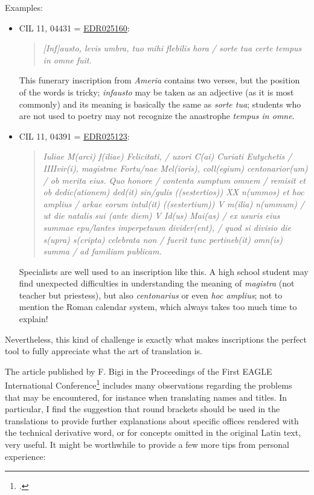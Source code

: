 \documentclass[amsthm,ebook]{saparticle}
\begin{document}
Examples:
\begin{itemize}
\item CIL 11, 04431 = \href{http://www.edr-edr.it/edr\_programmi/res\_complex\_comune.php?do=book\&id\_nr=EDR025160}{EDR025160}: \begin{quotation}
\emph{[Inf]austo, levis umbra, tuo mihi flebilis hora / sorte
tua certe tempus in omne fuit.}

\end{quotation}
This funerary inscription from \emph{Ameria} contains two verses, but the position of the words is tricky; \emph{infausto} may be
taken as an adjective (as it is most commonly) and its meaning is basically the same as \emph{sorte tua}; students who are not
used to poetry may not recognize the anastrophe \emph{tempus in omne}.

 \item CIL 11, 04391 = \href{http://www.edr-edr.it/edr\_programmi/res\_complex\_comune.php?do=book\&id\_nr=EDR025123}{EDR025123}:\begin{quotation}
\emph{ Iuliae M(arci) f(iliae) Felicitati, / uxori C(ai) Curiati
Eutychetis / IIIIvir(i), magistrae Fortu/nae Mel(ioris), coll(egium) centonarior(um) / ob merita eius. Quo honore /
contenta sumptum omnem / remisit et ob dedic(ationem) ded(it) sin/gulis ((sestertios)) XX n(ummos) et hoc amplius /
arkae eorum intul(it) ((sestertium)) V m(ilia) n(ummum) / ut die natalis sui (ante diem) V Id(us) Mai(as) / ex usuris
eius summae epu/lantes imperpetuum divider(ent), / quod si divisio die s(upra) s(cripta) celebrata non / fuerit tunc
pertineb(it) omn(is) summa / ad familiam publicam. }

\end{quotation}
Specialists are well used to an inscription like this. A high school student may find unexpected difficulties in
understanding the meaning of \emph{magistra} (not teacher but priestess), but also \emph{centonarius} or even \emph{hoc amplius}; not to
mention the Roman calendar system, which always takes too much time to explain!

\end{itemize}

Nevertheless, this kind of challenge is exactly what makes inscriptions the perfect tool to fully appreciate what the
art of translation is.

The article published by F. Bigi in the Proceedings of the First EAGLE International Conference\footnote{\citet{Bigi2014}.}
includes many observations regarding the problems that may be encountered, for instance when translating names and
titles. In particular, I find the suggestion that round brackets should be used in the translations to provide further
explanations about specific offices rendered with the technical derivative word, or for concepts omitted in the
original Latin text, very useful. 
It might be worthwhile to provide a few more tips from personal experience:
\end{document}
